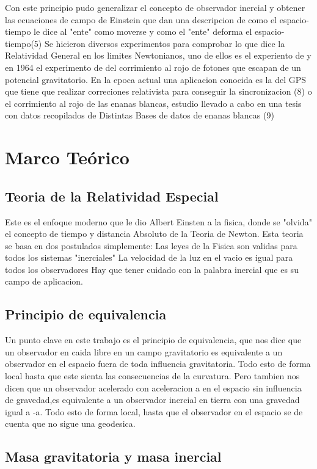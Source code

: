 \documentclass[12pt,twoside]{rif}
\begin{document}
Con este principio pudo generalizar el concepto de observador inercial y obtener las ecuaciones de campo de Einstein que dan
una descripcion de como el espacio-tiempo le dice al "ente" como moverse y como el "ente" deforma el espacio-tiempo(5)
Se hicieron diversos experimentos para comprobar lo que dice la Relatividad General en los limites Newtonianos, uno de ellos 
es el experiento de \citet*{PoundRebka1960} y en 1964 el experimento de \citet*{PoundSnider1964} del corrimiento al rojo de fotones que
escapan de un potencial gravitatorio.
En la epoca actual una aplicacion conocida es la del GPS que tiene que realizar correciones relativista para conseguir la 
sincronizacion (8) o el corrimiento al rojo de las enanas blancas, estudio llevado a cabo en una tesis con datos recopilados de 
Distintas Bases de datos de enanas blancas (9)
	\section{Marco Teórico}
	\subsection{Teoria de la Relatividad Especial}
	Este es el enfoque moderno que le dio Albert Einsten a la fisica, donde se "olvida" el concepto de tiempo y distancia Absoluto de la Teoria de Newton.
	Esta teoria se basa en dos postulados simplemente:
	Las leyes de la Fisica son validas para todos los sistemas "inerciales"
	La velocidad de la luz en el vacio es igual para todos los observadores 
	Hay que tener cuidado con la palabra inercial que es su campo de aplicacion.
	\subsection{Principio de equivalencia}
	Un punto clave en este trabajo es el principio de equivalencia, que nos dice que un observador en caida libre en un campo gravitatorio es equivalente a un observador en el espacio fuera de toda influencia gravitatoria. Todo esto de forma local hasta que este sienta las consecuencias de la curvatura. Pero tambien nos dicen que un observador acelerado con aceleracion a en el espacio sin influencia de gravedad,es equivalente a un observador inercial en tierra con una gravedad igual a -a. Todo esto de forma local, hasta que el observador en el espacio se de cuenta que no sigue una geodesica.

	\subsection{Masa gravitatoria y masa inercial}
	
\end{document}

